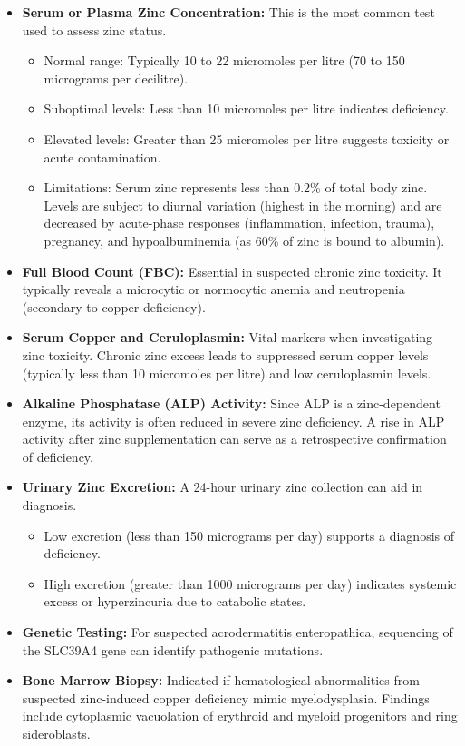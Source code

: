 \begin{itemize}
    \item \textbf{Serum or Plasma Zinc Concentration:} This is the most common test used to assess zinc status.
    \begin{itemize}
        \item Normal range: Typically 10 to 22 micromoles per litre (70 to 150 micrograms per decilitre).
        \item Suboptimal levels: Less than 10 micromoles per litre indicates deficiency.
        \item Elevated levels: Greater than 25 micromoles per litre suggests toxicity or acute contamination.
        \item Limitations: Serum zinc represents less than 0.2\% of total body zinc. Levels are subject to diurnal variation (highest in the morning) and are decreased by acute-phase responses (inflammation, infection, trauma), pregnancy, and hypoalbuminemia (as 60\% of zinc is bound to albumin).
    \end{itemize}
    \item \textbf{Full Blood Count (FBC):} Essential in suspected chronic zinc toxicity. It typically reveals a microcytic or normocytic anemia and neutropenia (secondary to copper deficiency).
    \item \textbf{Serum Copper and Ceruloplasmin:} Vital markers when investigating zinc toxicity. Chronic zinc excess leads to suppressed serum copper levels (typically less than 10 micromoles per litre) and low ceruloplasmin levels.
    \item \textbf{Alkaline Phosphatase (ALP) Activity:} Since ALP is a zinc-dependent enzyme, its activity is often reduced in severe zinc deficiency. A rise in ALP activity after zinc supplementation can serve as a retrospective confirmation of deficiency.
    \item \textbf{Urinary Zinc Excretion:} A 24-hour urinary zinc collection can aid in diagnosis.
    \begin{itemize}
        \item Low excretion (less than 150 micrograms per day) supports a diagnosis of deficiency.
        \item High excretion (greater than 1000 micrograms per day) indicates systemic excess or hyperzincuria due to catabolic states.
    \end{itemize}
    \item \textbf{Genetic Testing:} For suspected acrodermatitis enteropathica, sequencing of the SLC39A4 gene can identify pathogenic mutations.
    \item \textbf{Bone Marrow Biopsy:} Indicated if hematological abnormalities from suspected zinc-induced copper deficiency mimic myelodysplasia. Findings include cytoplasmic vacuolation of erythroid and myeloid progenitors and ring sideroblasts.
\end{itemize}

